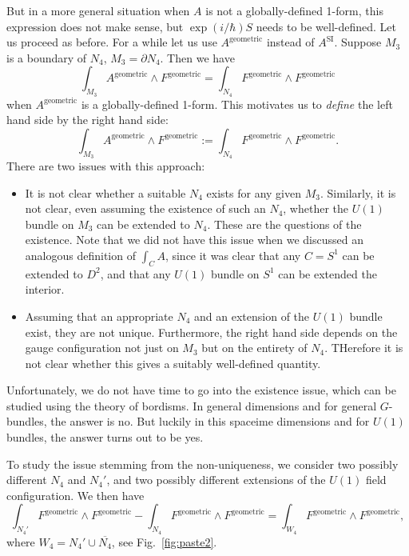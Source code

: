\documentclass[12pt]{article}
\numberwithin{equation}{section}
\numberwithin{figure}{section}
\theoremstyle{remark}
\begin{document}
But in a more general situation when $A$ is not a globally-defined 1-form,
this expression does not make sense,
but $\exp(i/\hbar)S$ needs to be well-defined.
Let us proceed as before.
For a while let us use $A^\text{geometric}$ instead of $A^\text{SI}$.
Suppose $M_3$ is a boundary of $N_4$, $M_3=\partial N_4$.
Then we have \begin{equation}
  \int_{M_3} A^\text{geometric}\wedge F^\text{geometric}
  = \int_{N_4} F^\text{geometric}\wedge F^\text{geometric}
\end{equation}
when $A^\text{geometric}$ is a globally-defined 1-form.
This motivates us to \emph{define} the left hand side by the right hand side:
\begin{equation}
  \int_{M_3} A^\text{geometric}\wedge F^\text{geometric}
  := \int_{N_4} F^\text{geometric}\wedge F^\text{geometric}.
  \label{eq:AFdef}
\end{equation}
There are two issues with this approach:
\begin{itemize}
\item It is not clear whether a suitable $N_4$ exists for any given $M_3$.
Similarly, it is not clear, even assuming the existence of such an $N_4$,
whether the $U(1)$ bundle on $M_3$ can be extended to $N_4$.
These are the questions of the existence.
Note that we did not have this issue when we discussed an analogous definition of $\int_C A$, 
since it was clear that any $C=S^1$ can be extended to $D^2$,
and that any $U(1)$ bundle on $S^1$ can be extended the interior.
\item Assuming that an appropriate $N_4$ and an extension of the $U(1)$ bundle exist, they are not unique. 
Furthermore, the right hand side depends on the gauge configuration not just on $M_3$ but on the entirety of $N_4$.
THerefore it is not clear whether this gives a suitably well-defined quantity.
\end{itemize}

Unfortunately, we do not have time to go into the existence issue,
which can be studied using the theory of bordisms.
In general dimensions and for general $G$-bundles, the answer is no.
But luckily in this spaceime dimensions and for $U(1)$ bundles, 
the answer turns out to be yes.


To study the issue stemming from the non-uniqueness, 
we consider two possibly different $N_4$ and $N_4'$,
and two possibly different extensions of the $U(1)$ field configuration.
We then have \begin{equation}
  \int_{N_4'} F^\text{geometric}\wedge F^\text{geometric}
  - \int_{N_4} F^\text{geometric}\wedge F^\text{geometric}
  = \int_{W_4} F^\text{geometric}\wedge F^\text{geometric},
\end{equation}
where $W_4=N_4'\cup \overline{N_4}$,
see Fig.~\ref{fig:paste2}.
\end{document}
